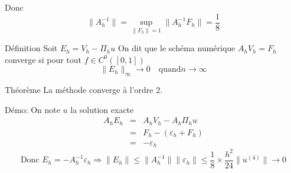 \documentclass{beamer}
\begin{document}
 \begin{frame} 
   
   
 Donc \[ \|A_h^{-1}\|=\sup_{\|F_h\|=1}\|A_h^{-1}F_h\|=\frac 18\]
 \begin{block}{Définition}
  Soit $E_h=V_h-\Pi_h u$  On dit que le schéma numérique $A_h V_h =F_h$  converge  si pour tout $f\in C^0([0,1])$ 
  \[\|E_h\|_{\infty}\to 0 \quad \mbox{quand} n\to \infty\]
  \end{block}
 \begin{block}{Théorème}
  La méthode converge à l'ordre 2.
  \end{block}
  Démo: On note $u$ la solution exacte
  \[
  \begin{array}{ccl}
  A_hE_h&=& A_hV_h-A_h\Pi_h u\\
  &=& F_h-(\varepsilon_h+F_h)\\
  &=&-\varepsilon_h
  \end{array}
  \]
  \[\mbox{Donc } E_h=-A_h^{-1}\varepsilon_h\Longrightarrow \|E_h\|\leq \|A_h^{-1}\| \|\varepsilon_h\|\leq \frac{1}{8}\times \frac{h^2}{24} \|u^{(4)}\|\to 0 \]
 \end{frame} 
 
\end{document}
